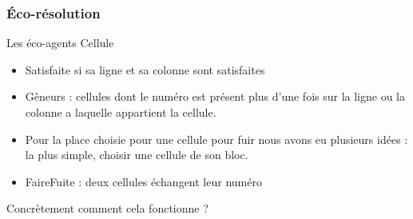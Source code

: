 \begin{frame}
    \frametitle{Éco-résolution}
    \begin{block}{Les éco-agents Cellule}
    		\begin{itemize}
    			\item Satisfaite si sa ligne et sa colonne sont satisfaites
    			\item Gêneurs : cellules dont le numéro est présent plus d'une fois sur la ligne ou la colonne a laquelle appartient la cellule.
    			\item Pour la place choisie pour une cellule pour fuir nous avons eu plusieurs idées : la plus simple, choisir une cellule de son bloc.
    			\item FaireFuite : deux cellules échangent leur numéro
    		\end{itemize}
    \end{block}
    \pause
    \begin{alertblock}{}
		Concrètement comment cela fonctionne ? 	
	\end{alertblock}
\end{frame}

